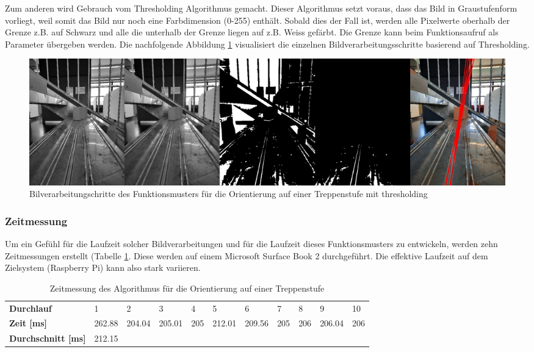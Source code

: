 Zum anderen wird Gebrauch vom Thresholding Algorithmus\cite{OpenCV-Threshold} gemacht. Dieser Algorithmus setzt voraus, dass das Bild in Graustufenform vorliegt, weil somit das Bild nur noch eine Farbdimension (0-255) enthält. Sobald dies der Fall ist, werden alle Pixelwerte oberhalb der Grenze z.B. auf Schwarz und alle die unterhalb der Grenze liegen auf z.B. Weiss gefärbt. Die Grenze kann beim Funktionsaufruf als Parameter übergeben werden. Die nachfolgende Abbildung \ref{fig:bildverarbeitungsschritte-threshold} visualisiert die einzelnen Bildverarbeitungsschritte basierend auf Thresholding.
\begin{figure}[H]
  \includegraphics[width=1.0\textwidth]{img/orientierung-treppenstufe/collageThresh.jpg}
  \centering
  \caption{Bilverarbeitungschritte des Funktionsmusters für die Orientierung auf einer Treppenstufe mit thresholding}
  \label{fig:bildverarbeitungsschritte-threshold}
\end{figure}
  
\newpage
\subsubsection{Zeitmessung}
Um ein Gefühl für die Laufzeit solcher Bildverarbeitungen und für die Laufzeit dieses Funktionsmusters zu entwickeln, werden zehn Zeitmessungen erstellt (Tabelle \ref{tab:zeitmessung-bildverarbeitung}. Diese werden auf einem Microsoft Surface Book 2 durchgeführt. Die effektive Laufzeit auf dem Zielsystem (Raspberry Pi) kann also stark variieren.

\begin{center}
\begin{table}[H]
    \begin{tabular}{l|l|l|l|l|l|l|l|l|l|l}
        \textbf{Durchlauf} & 1 & 2 & 3 & 4 & 5 & 6 & 7 & 8 & 9 & 10 \\
        \textbf{Zeit [ms]} & 262.88 & 204.04 & 205.01 & 205 & 212.01 & 209.56 & 205 & 206 & 206.04 & 206 \\
        \textbf{Durchschnitt [ms]} & 212.15 \\
    \end{tabular}
    \caption{Zeitmessung des Algorithmus für die Orientierung auf einer Treppenstufe}
    \label{tab:zeitmessung-bildverarbeitung}
\end{table}
\end{center}

